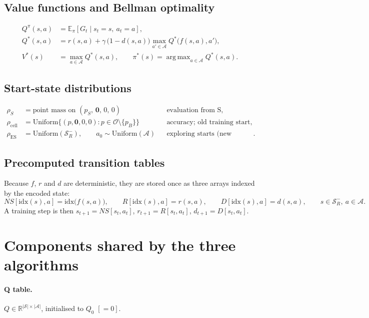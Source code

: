 \documentclass[11pt]{article}
\newcommand{\Sset}{\mathcal{S}}
\newcommand{\Aset}{\mathcal{A}}
\newcommand{\Open}{\mathcal{O}}
\newcommand{\Qs}{Q^{*}}
\DeclareMathOperator*{\argmax}{arg\,max}
\begin{document}
\subsection{Value functions and Bellman optimality}
\begin{align}
Q^{\pi}(s,a) &= \mathbb{E}_{\pi}\left[G_t \mid s_t=s,\ a_t=a\right],\\
\Qs(s,a) &= r(s,a)+\gamma\,\big(1-d(s,a)\big)\max_{a'\in\Aset}\Qs\big(f(s,a),a'\big),\\
V^{*}(s) &= \max_{a\in\Aset}\Qs(s,a),\qquad \pi^{*}(s)=\argmax_{a\in\Aset}\Qs(s,a).
\end{align}

\subsection{Start-state distributions}\label{sec:start}
\begin{align}
\rho_{S} &= \text{point mass on } (p_S,\,\mathbf{0},\,0,\,0) && \text{evaluation from S},\\
\rho_{\mathrm{cell}} &= \mathrm{Uniform}\{(p,\mathbf{0},0,0): p\in\Open\setminus\{p_B\}\} && \text{accuracy; old training start},\\
\rho_{\mathrm{ES}} &= \mathrm{Uniform}(\Sset_R^{-}),\qquad a_0\sim\mathrm{Uniform}(\Aset) && \text{exploring starts (new training start)}.
\end{align}

\subsection{Precomputed transition tables}
Because $f$, $r$ and $d$ are deterministic, they are stored once as three arrays indexed by the encoded state:
\begin{equation}
NS[\mathrm{idx}(s),a]=\mathrm{idx}\big(f(s,a)\big),\qquad R[\mathrm{idx}(s),a]=r(s,a),\qquad D[\mathrm{idx}(s),a]=d(s,a),
\qquad s\in\Sset_R^{-},\ a\in\Aset .
\end{equation}
A training step is then $s_{t+1}=NS[s_t,a_t]$, $r_{t+1}=R[s_t,a_t]$, $d_{t+1}=D[s_t,a_t]$.

\section{Components shared by the three algorithms}
\paragraph{Q table.} $Q\in\mathbb{R}^{|\Sset|\times|\Aset|}$, initialised to $Q_0$ $[=0]$.
\end{document}
